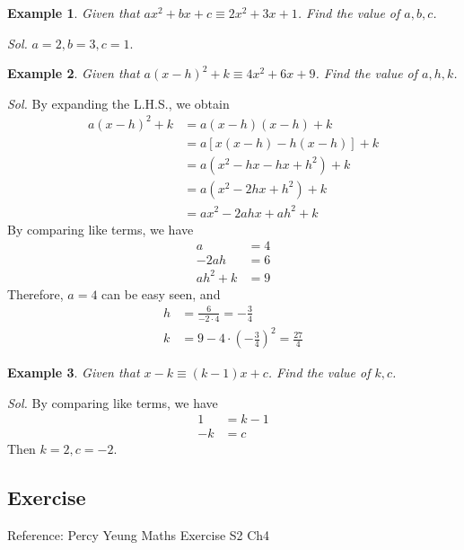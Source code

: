 \documentclass[12pt]{article}
\newtheorem{example}{Example}
\begin{document}
    \begin{example}
        Given that $ax^2+bx+c\equiv 2x^2+3x+1$. Find the value of $a,b,c$.
    \end{example}

    \textit{ Sol.} $a=2, b=3, c=1$.

    \begin{example}
        Given that $a(x-h)^2+k\equiv 4x^2+6x+9$. Find the value of $a,h,k$.
    \end{example}

    \textit{ Sol.} By expanding the L.H.S., we obtain\begin{align*}
        a(x-h)^2+k&=a(x-h)(x-h)+k\\
        &=a[x(x-h)-h(x-h)]+k\\
        &=a(x^2-hx-hx+h^2)+k\\
        &=a(x^2-2hx+h^2)+k\\
        &=ax^2-2ahx+ah^2+k
    \end{align*}
    By comparing like terms, we have\begin{align*}
        a&=4\\
        -2ah&=6\\
        ah^2+k&=9
    \end{align*}
    Therefore, $a=4$ can be easy seen, and \begin{align*}
        h&=\frac{6}{-2\cdot 4}=-\frac{3}{4}\\
        k&=9-4\cdot (-\frac{3}{4})^2=\frac{27}{4}
    \end{align*}

    \begin{example}
        Given that $x-k\equiv (k-1)x+c$. Find the value of $k,c$.
    \end{example}

    \textit{ Sol.} By comparing like terms, we have\begin{align*}
        1&=k-1\\
        -k&=c
    \end{align*} Then $k=2,c=-2$.

    \subsection*{Exercise}
    Reference: Percy Yeung Maths Exercise S2 Ch4
    
\end{document}
